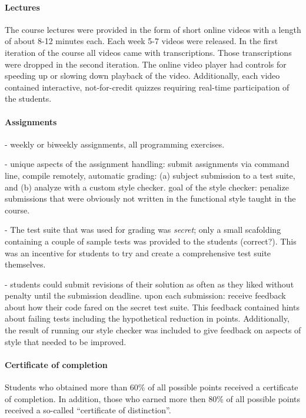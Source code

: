 \documentclass{sig-alternate}
\begin{document}
\paragraph{Lectures} The course lectures were provided in the form of short
online videos with a length of about 8-12 minutes each. Each week 5-7 videos
were released. In the first iteration of the course all videos came with
transcriptions. Those transcriptions were dropped in the second iteration. The
online video player had controls for speeding up or slowing down playback of
the video. Additionally, each video contained interactive, not-for-credit
quizzes requiring real-time participation of the students.

\paragraph{Assignments}

- weekly or biweekly assignments, all programming exercises.

- unique aspects of the assignment handling: submit assignments via command line, compile remotely, automatic grading: (a) subject submission to a test suite, and (b) analyze with a custom style checker. goal of the style checker: penalize submissions that were obviously not written in the functional style taught in the course.

- The test suite that was used for grading was {\em secret}; only a small scafolding containing a couple of sample tests was provided to the students (correct?). This was an incentive for students to try and create a comprehensive test suite themselves.

- students could submit revisions of their solution as often as they liked
 without penalty until the submission deadline. upon each submission: receive feedback about how their code fared on the secret test suite. This feedback contained hints about failing tests including the hypothetical reduction in points. Additionally, the result of running our style checker was included to give feedback on aspects of style that needed to be improved.

\paragraph{Certificate of completion} Students who obtained more than 60\% of
all possible points received a certificate of completion. In addition, those
who earned more then 80\% of all possible points received a so-called
``certificate of distinction''.
\end{document}
